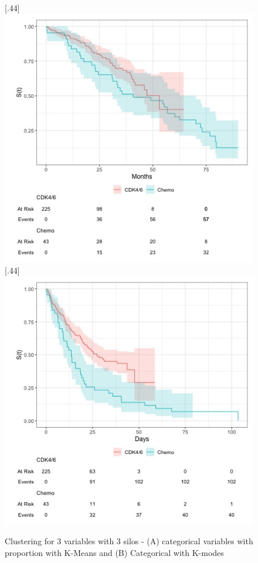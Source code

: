 \begin{figure}[ht]
\caption{Clustering for 3 variables with 3 silos - (A) categorical variables with  proportion with K-Means and (B)  Categorical with K-modes  }\label{fig:grouped} 
  [.44\linewidth]{%
    \includegraphics[width=\linewidth]{figures/grouped_curve_OS.jpeg}%
  }%
  \hfill
  [.44\linewidth]{%
    \includegraphics[width=\linewidth]{figures/grouped_curve_PFS.jpeg}%
  }
\end{figure}


